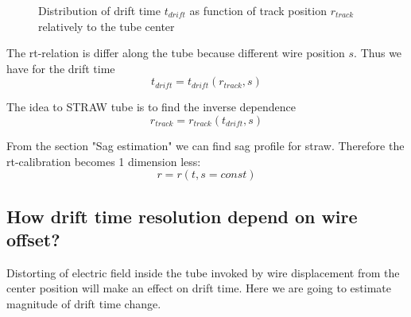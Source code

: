 \documentclass[]{article}
\begin{document}
	\begin{figure}[h!]
		\centering
		\qquad
		\caption{Distribution of drift time $t_{drift}$ as function of track position $r_{track}$ relatively to the tube center}			
	\end{figure}	
	
	The rt-relation is differ along the tube because different wire position $s$. Thus we have for the drift time 
	\begin{equation}
	t_{drift} = t_{drift}(r_{track},s)
	\end{equation}
	
	The idea to STRAW tube is to find the inverse dependence
	\begin{equation}
		r_{track} = r_{track}(t_{drift},s)
	\end{equation}
	
	From the section "Sag estimation" we can find sag profile for straw. Therefore the rt-calibration becomes 1 dimension less:
	\begin{equation}
		r = r(t,s=const)
	\end{equation}
	
	
	\subsection{How drift time resolution depend on wire offset?}
	
	Distorting of electric field inside the tube invoked by wire displacement from the center position will make an effect on drift time. Here we are going to estimate magnitude of drift time change.
	
\end{document}
